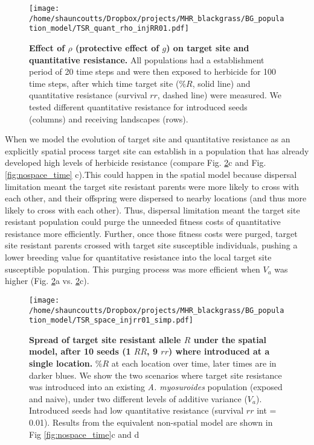 \documentclass[10pt,letterpaper]{article}
\begin{document}
\begin{figure}[!h] 
	\texttt{[image: /home/shauncoutts/Dropbox/projects/MHR\_blackgrass/BG\_population\_model/TSR\_quant\_rho\_injRR01.pdf]}
\caption{{\bf Effect of $\rho$ (protective effect of $g$) on target site and quantitative resistance.} All populations had a establishment period of 20 time steps and were then exposed to herbicide for 100 time steps, after which time target site ($\%R$, solid line) and quantitative resistance (survival $rr$, dashed line) were measured. We tested different quantitative resistance for introduced seeds (columns) and receiving landscapes (rows).}        
\label{fig:gpro}
\end{figure}

When we model the evolution of target site and quantitative resistance as an explicitly spatial process target site can establish in a population that has already developed high levels of herbicide resistance (compare Fig. \ref{fig:pro_R_spr}c and Fig. \ref{fig:nospace_time} c).This could happen in the spatial model because dispersal limitation meant the target site resistant parents were more likely to cross with each other, and their offspring were dispersed to nearby locations (and thus more likely to cross with each other). Thus, dispersal limitation meant the target site resistant population could purge the unneeded fitness costs of quantitative resistance more efficiently. Further, once those fitness costs were purged, target site resistant parents crossed with target site susceptible individuals, pushing a lower breeding value for quantitative resistance into the local target site susceptible population. This purging process was more efficient when $V_a$ was higher (Fig. \ref{fig:pro_R_spr}a vs. \ref{fig:pro_R_spr}c).

\begin{figure}[!h] 
	\texttt{[image: /home/shauncoutts/Dropbox/projects/MHR\_blackgrass/BG\_population\_model/TSR\_space\_injrr01\_simp.pdf]}
\caption{{\bf Spread of target site resistant allele $R$ under the spatial model, after 10 seeds (1 $RR$, 9 $rr$) where introduced at a single location.} $\%R$ at each location over time, later times are in darker blues. We show the two scenarios where target site resistance was introduced into an existing \textit{A. myosuroides} population (exposed and naive), under two different levels of additive variance ($V_a$). Introduced seeds had low quantitative resistance (survival $rr$ int = 0.01). Results from the equivalent non-spatial model are shown in Fig \ref{fig:nospace_time}c and d} 
\label{fig:pro_R_spr}
\end{figure}
\end{document}
